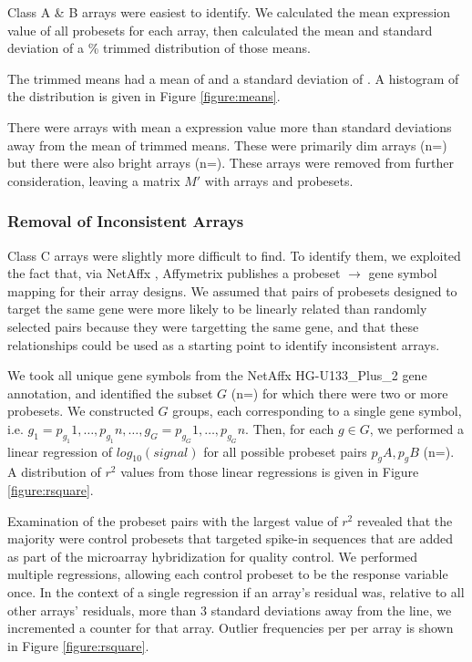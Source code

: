 \documentclass{article}
\begin{document}
Class A \& B arrays were easiest to identify.  We calculated the mean
expression value of all probesets for each array, then calculated the mean and
standard deviation of a \% trimmed distribution of those
means.

The trimmed means had a mean of  and a standard
deviation of .  A histogram of the distribution is
given in Figure \ref{figure:means}.

%

There were  arrays with mean a expression value more
than  standard deviations away from the mean of
trimmed means.  These were primarily dim arrays (n=) but there
were also bright arrays (n=).  These arrays were removed
from further consideration, leaving a matrix $M\prime$ with 
arrays and  probesets.

\subsubsection{Removal of Inconsistent Arrays}\label{inconsistent}

Class C arrays were slightly more difficult to find.  To identify them, we
exploited the fact that, via NetAffx \cite{netaffx}, Affymetrix publishes a
probeset $\rightarrow$ gene symbol mapping for their array designs.  We assumed
that pairs of probesets designed to target the same gene were more likely to be
linearly related than randomly selected pairs because they were targetting the
same gene, and that these relationships could be used as a starting point to
identify inconsistent arrays.

We took all  unique gene symbols from
the NetAffx HG-U133\_Plus\_2 gene annotation, and identified the subset $G$
(n=) for which there were two or more probesets.  We
constructed $G$ groups, each corresponding to a single gene symbol, i.e.
$g_1={p_{g_1}1,\dots,p_{g_1}n},\dots,g_G={p_{g_G}1,\dots,p_{g_G}n}$.  Then, for
each $g{\in}G$, we performed a linear regression of $log_10(signal)$ for all
possible probeset pairs $p_gA,p_gB$ (n=).  A
distribution of $r^2$ values from those linear regressions is given in Figure
\ref{figure:rsquare}.

Examination of the probeset pairs with the largest value of $r^2$ revealed that
the majority were control probesets that targeted spike-in sequences that are
added as part of the microarray hybridization for quality control.  We
performed  multiple regressions, allowing each
control probeset to be the response variable once.  In the context of a single
regression if an array's residual was, relative to all other arrays'
residuals, more than 3 standard deviations away from the line, we incremented a
counter for that array.  Outlier frequencies per per array is shown in Figure
\ref{figure:rsquare}.
\end{document}

